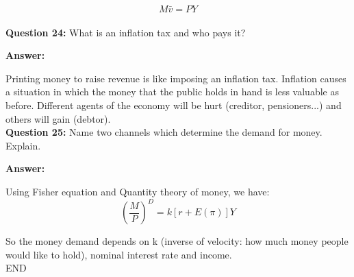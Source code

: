 \documentclass[a4paper, 11pt]{article}
\begin{document}
$$M\bar{v} = PY$$ \\


\textbf{Question 24:} What is an inflation tax and who pays it?

\textbf{Answer:} 

Printing money to raise revenue is like imposing an inflation tax. Inflation causes a situation in which the money that the public holds in hand is less valuable as before. Different agents of the economy will be hurt (creditor, pensioners...) and others will gain (debtor). \\


\textbf{Question 25:} Name two channels which determine the demand for money. Explain.

\textbf{Answer:} 

Using Fisher equation and Quantity theory of money, we have:
$$(\frac{M}{P})^{D} = k[r + E(\pi)]Y$$

So the money demand depends on k (inverse of velocity: how much money people would like to hold), nominal interest rate and income. \\


\centering
END
\end{document}
